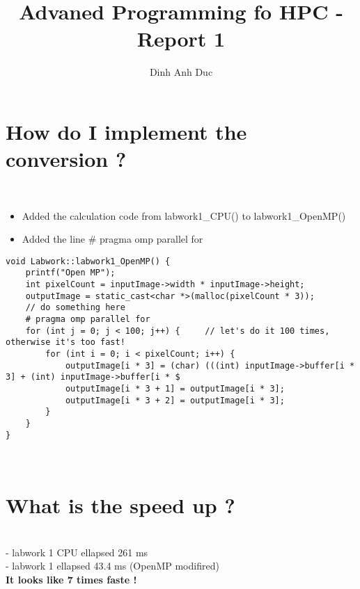 \documentclass{article}
\title{Advaned Programming fo HPC - Report 1}
\author{Dinh Anh Duc}
\begin{document}
\maketitle

\section*{How do I implement the conversion ?}
\\
\begin{itemize}
\item Added the calculation code from labwork1\_CPU() to labwork1\_OpenMP()
\item Added the line # pragma omp parallel for 
\end{itemize}
\begin{lstlisting}
void Labwork::labwork1_OpenMP() {
    printf("Open MP");
    int pixelCount = inputImage->width * inputImage->height;
    outputImage = static_cast<char *>(malloc(pixelCount * 3));
    // do something here
    # pragma omp parallel for
    for (int j = 0; j < 100; j++) {     // let's do it 100 times, otherwise it's too fast!
        for (int i = 0; i < pixelCount; i++) {
            outputImage[i * 3] = (char) (((int) inputImage->buffer[i * 3] + (int) inputImage->buffer[i * $
            outputImage[i * 3 + 1] = outputImage[i * 3];
            outputImage[i * 3 + 2] = outputImage[i * 3];
        }
    }
}
\end{lstlisting}
\\
\section*{What is the speed up ?}
\\
- labwork 1 CPU ellapsed 261 ms
\\
- labwork 1 ellapsed 43.4 ms (OpenMP modifired)
\\
\textbf{It looks like 7 times faste !} 
\end{document}
